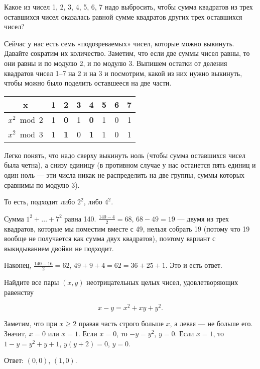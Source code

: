 
\begin{itemize}

\itA Какое из чисел 1, 2, 3, 4, 5, 6, 7 надо выбросить, чтобы сумма квадратов из трех оставшихся чисел оказалась равной сумме квадратов других трех оставшихся чисел?

\itr Сейчас у нас есть семь «подозреваемых» чисел, которые можно выкинуть. Давайте сократим их количество. Заметим, что если две суммы чисел равны, то они равны и по модулю 2, и по модулю 3. Выпишем остатки от деления квадратов чисел 1–7 на 2 и на 3 и посмотрим, какой из них нужно выкинуть, чтобы можно было поделить оставшееся на две части.

\begin{center} \begin{tabular}{|c|c|c|c|c|c|c|c|}
	\hline
	x & 1 & \bfseries 2 & 3 & \bfseries 4 & 5 & 6 & 7 \\ \hline
	$x^2 \bmod 2$ & 1 & \bfseries 0 & 1 & \bfseries 0 & 1 & 0 & 1\\ \hline
	$x^2 \bmod 3$ & 1 & \bfseries 1 & 0 & \bfseries 1 & 1 & 0 & 1\\ \hline
\end{tabular} \end{center}

Легко понять, что надо сверху выкинуть ноль (чтобы сумма оставшихся чисел была четна), а снизу единицу (в противном случае у нас останется пять единиц и один ноль — эти числа никак не распределить на две группы, суммы которых сравнимы по модулю 3).

То есть, подходит либо $2^2$, либо $4^2$.

Сумма $1^2 + \ldots + 7^2$ равна 140. $\tfrac{140-4}{2}=68$, $68-49=19$ — двумя из трех квадратов, которые мы поместим вместе с 49, нельзя собрать 19 (потому что 19 вообще не получается как сумма двух квадратов), поэтому вариант с выкидыванием двойки не подходит.

Наконец, $\tfrac{140-16}{2} = 62$, $49+9+4=62=36+25+1$. Это и есть ответ.

\itC Найдите все пары $(x, y)$ неотрицательных целых чисел, удовлетворяющих равенству

$$x-y=x^2+xy+y^2.$$

\itr Заметим, что при $x \ge 2$ правая часть строго больше $x$, а левая — не больше его. Значит, $x=0$ или $x=1$. Если $x=0$, то $-y = y^2$, $y=0$. Если $x=1$, то $1-y=y^2+y+1$, $y(y+2)=0$, $y=0$.

Ответ: $(0,0)$, $(1,0)$.
\end{itemize}

